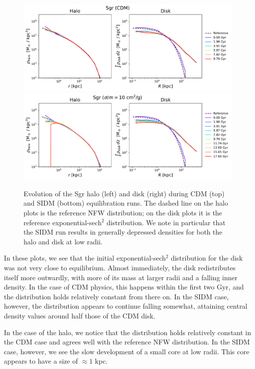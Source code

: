 \begin{figure}
    \centering
    \includegraphics[width=0.9\linewidth]{figs/sgr_evolution_cdm.pdf}
    \includegraphics[width=0.9\linewidth]{figs/sgr_evolution_sidm.pdf}
    \caption{%
        Evolution of the Sgr halo (left) and disk (right) during CDM (top) and
        SIDM (bottom) equilibration runs.  The dashed line on the halo plots
        is the reference NFW distribution; on the disk plots it is the
        reference exponential-sech$^2$ distribution.  We note in particular
        that the SIDM run results in generally depressed densities for both
        the halo and disk at low radii.
    }
    \label{fig:sgr_evo}
\end{figure}

In these plots, we see that the initial exponential-sech$^2$ distribution for
the disk was not very close to equilibrium. Almost immediately, the disk
redistributes itself more outwardly, with more of its mass at larger radii and a
falling inner density. In the case of CDM physics, this happens within the first
two Gyr, and the distribution holds relatively constant from there on. In the
SIDM case, however, the distribution appears to continue falling somewhat,
attaining central density values around half those of the CDM disk. 

In the case of the halo, we notice that the distribution holds relatively
constant in the CDM case and agrees well with the reference NFW distribution. In
the SIDM case, however, we see the slow development of a small core at low
radii. This core appears to have a size of $\approx 1$ kpc. 

